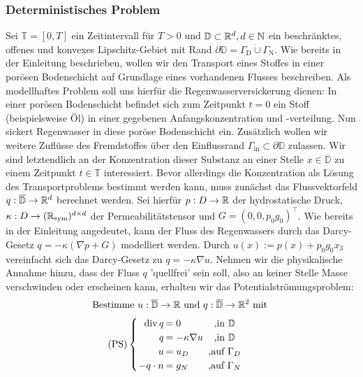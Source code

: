 \subsubsection{Deterministisches Problem}
\label{det_prob}
Sei $\mathbb{T} = [0,T]$ ein Zeitintervall für $T>0$ und $\mathbb{D} \subset \mathbb{R}^d , d \in \mathbb{N}$ ein beschränktes, offenes und konvexes Lipschitz-Gebiet mit Rand $ \partial \mathbb{D} = \Gamma_{\text{D}}  \dot{\cup} \Gamma_{\text{N}} $. 
Wie bereits in der Einleitung beschrieben, wollen wir den Transport eines Stoffes in einer porösen Bodenschicht auf Grundlage eines vorhandenen Flusses beschreiben. 
Als modellhaftes Problem soll uns hierfür die Regenwasserversickerung dienen: In einer porösen Bodenschicht befindet sich zum Zeitpunkt $t=0$ ein Stoff (beispielsweise Öl) in einer gegebenen Anfangskonzentration und -verteilung. Nun sickert Regenwasser in diese poröse Bodenschicht ein. Zusätzlich wollen wir weitere Zuflüsse des Fremdstoffes über den Einflussrand $\Gamma_{\text{in}} \subset \partial \mathbb{D}$ zulassen.
Wir sind letztendlich an der Konzentration dieser Substanz an einer Stelle $x \in \overline{\mathbb{D}}$ zu einem Zeitpunkt $t \in \mathbb{T}$ interessiert. \newline
Bevor allerdings die Konzentration als Lösung des Transportproblems bestimmt werden kann, muss zunächst das Flussvektorfeld $q: \overline{\mathbb{D}} \rightarrow \mathbb{R}^d$ berechnet werden. \newline
Sei hierfür $p: D \rightarrow \mathbb{R}$ der hydrostatische Druck, $\kappa: D \rightarrow (\mathbb{R}_{\text{sym}})^{d \times d}$ der Permeabilitätstensor und $G=(0,0,p_0 g_0)^{\top}$. 
Wie bereits in der Einleitung angedeutet, kann der Fluss des Regenwassers durch das Darcy-Gesetz $q=-\kappa(\nabla p + G)$ modelliert werden.
Durch $u(x) := p(x) + p_0 g_0 x_3$ vereinfacht sich das Darcy-Gesetz zu $q=-\kappa \nabla u$.\newline
Nehmen wir die physikalische Annahme hinzu, dass der Fluss $q$ 'quellfrei' sein soll, also an keiner Stelle Masse verschwinden oder erscheinen kann, erhalten wir das Potentialströmungsproblem:
\[ \text{Bestimme } u:\overline{\mathbb{D}} \to \R \text{ und } q: \overline{\mathbb{D}} \to \R^2 \text{ mit } \newline \]
\[\setlength\arraycolsep{1pt}
\text{(PS)}\begin{cases} 
\begin{array}{rlc}
\dive q     &= 0                 &\text{ ,} \text{in } \mathbb{D}\\
q           &= - \kappa \nabla u &\text{ ,} \text{in }\mathbb{D}\\
u           &= u_D               &\text{ ,} \text{auf } \Gamma_D \\
-q \cdot n  &= g_N               &\text{ ,} \text{auf } \Gamma_N 
\end{array}
\end{cases} \\
\]

